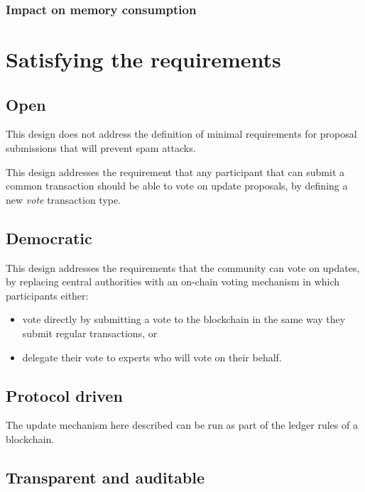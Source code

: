 \documentclass[11pt,a4paper]{article}
\begin{document}
\subsubsection{Impact on memory consumption}
\label{sec:impact-memory-cons}

\section{Satisfying the requirements}
\label{sec:satisfy-requ}


\subsection{Open}
\label{sec:sat-open}

This design does not address the definition of minimal requirements for proposal
submissions that will prevent spam attacks.

This design addresses the requirement that any participant that can submit a
common transaction should be able to vote on update proposals, by
defining a new \emph{vote} transaction type.

\subsection{Democratic}
\label{sec:sat-decentr-decis-making}

This design addresses the requirements that the community can vote on updates,
by replacing central authorities with an on-chain voting mechanism in which
participants either:
\begin{itemize}
\item vote directly by submitting a vote to the blockchain in the same way they
  submit regular transactions, or
\item delegate their vote to experts who will vote on their behalf.
\end{itemize}

\subsection{Protocol driven}
\label{sec:sat-protocol-driven}

The update mechanism here described can be run as part of the ledger rules of a
blockchain.

\subsection{Transparent and auditable}
\label{sec:sat-transp-audit}
\end{document}
